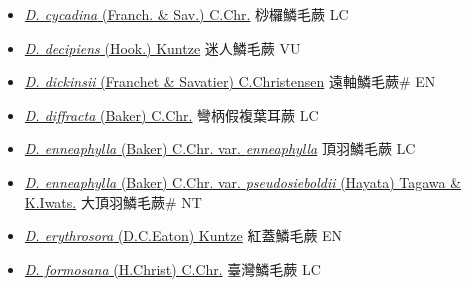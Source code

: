 \begin{itemize}
\begin{itemize}
        \item[] \href{http://www.theplantlist.org/tpl1.1/search?q=Dryopteris+cycadina}{\textit{D. cycadina} (Franch. \& Sav.) C.Chr.}     桫欏鱗毛蕨 LC
        \item[] \href{http://www.theplantlist.org/tpl1.1/search?q=Dryopteris+decipiens}{\textit{D. decipiens} (Hook.) Kuntze}   迷人鱗毛蕨 VU
        \item[] \href{http://www.theplantlist.org/tpl1.1/search?q=Dryopteris+dickinsii}{\textit{D. dickinsii} (Franchet \& Savatier) C.Christensen}   遠軸鱗毛蕨\# EN
        \item[] \href{http://www.theplantlist.org/tpl1.1/search?q=Dryopteris+diffracta}{\textit{D. diffracta} (Baker) C.Chr.}     彎柄假複葉耳蕨 LC
        \item[] \href{http://www.theplantlist.org/tpl1.1/search?q=Dryopteris+enneaphylla+var.+enneaphylla}{\textit{D. enneaphylla} (Baker) C.Chr. var. \textit{enneaphylla}}   頂羽鱗毛蕨 LC
        \item[] \href{http://www.theplantlist.org/tpl1.1/search?q=Dryopteris+enneaphylla+var.+pseudosieboldii}{\textit{D. enneaphylla} (Baker) C.Chr. var. \textit{pseudosieboldii} (Hayata) Tagawa \& K.Iwats.}   大頂羽鱗毛蕨\# NT
        \item[] \href{http://www.theplantlist.org/tpl1.1/search?q=Dryopteris+erythrosora}{\textit{D. erythrosora} (D.C.Eaton) Kuntze}   紅蓋鱗毛蕨 EN
        \item[] \href{http://www.theplantlist.org/tpl1.1/search?q=Dryopteris+formosana}{\textit{D. formosana} (H.Christ) C.Chr.}   臺灣鱗毛蕨 LC

\end{itemize}
\end{itemize}
